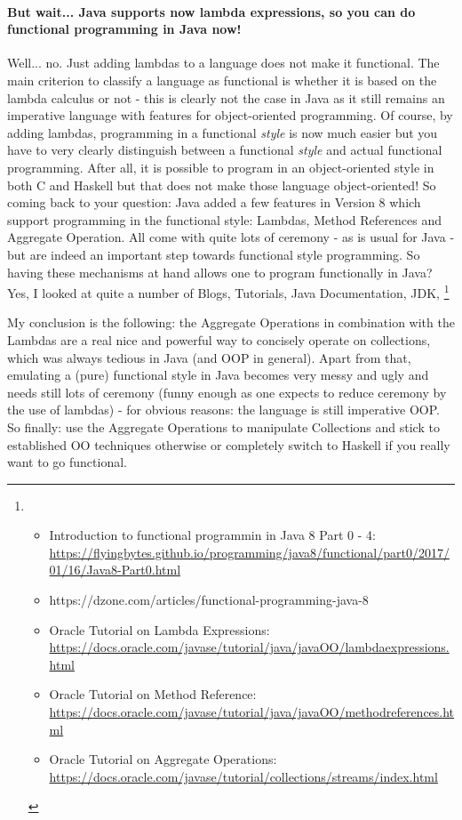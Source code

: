 \paragraph{But wait... Java supports now lambda expressions, so you can do functional programming in Java now!} Well... no. Just adding lambdas to a language does not make it functional. The main criterion to classify a language as functional is whether it is based on the lambda calculus or not - this is clearly not the case in Java as it still remains an imperative language with features for object-oriented programming. Of course, by adding lambdas, programming in a functional \textit{style} is now much easier but you have to very clearly distinguish between a functional \textit{style} and actual functional programming. After all, it is possible to program in an object-oriented style in both C and Haskell but that does not make those language object-oriented!
So coming back to your question: Java added a few features in Version 8 which support programming in the functional style: Lambdas, Method References and Aggregate Operation. All come with quite lots of ceremony - as is usual for Java - but are indeed an important step towards functional style programming.
So having these mechanisms at hand allows one to program functionally in Java? Yes, I looked at quite a number of Blogs, Tutorials, Java Documentation, JDK,
\footnote{
	\begin{itemize}
		\item Introduction to functional programmin in Java 8 Part 0 - 4: \url{https://flyingbytes.github.io/programming/java8/functional/part0/2017/01/16/Java8-Part0.html}
		\item https://dzone.com/articles/functional-programming-java-8
		\item Oracle Tutorial on Lambda Expressions: \url{https://docs.oracle.com/javase/tutorial/java/javaOO/lambdaexpressions.html}
		\item Oracle Tutorial on Method Reference: \url{https://docs.oracle.com/javase/tutorial/java/javaOO/methodreferences.html}
		\item Oracle Tutorial on Aggregate Operations: \url{https://docs.oracle.com/javase/tutorial/collections/streams/index.html}
	\end{itemize}
}

My conclusion is the following: the Aggregate Operations in combination with the Lambdas are a real nice and powerful way to concisely operate on collections, which was always tedious in Java (and OOP in general). Apart from that, emulating a (pure) functional style in Java becomes very messy and ugly and needs still lots of ceremony (funny enough as one expects to reduce ceremony by the use of lambdas) - for obvious reasons: the language is still imperative OOP.
So finally: use the Aggregate Operations to manipulate Collections and stick to established OO techniques otherwise or completely switch to Haskell if you really want to go functional.
